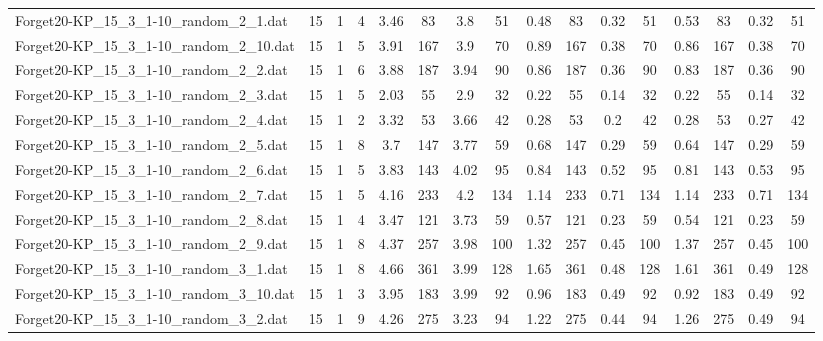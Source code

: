 \begin{sidewaystable}[!ht]
{\begin{tabular}{lccccccccccccccc}
Forget20-KP\_15\_3\_1-10\_random\_2\_1.dat & 15 & 1 & 4 & 3.46 & 83 & 3.8 & 51 & 0.48 & 83 &  \textcolor{blue2}{0.32} & 51 & 0.53 & 83 &  \textcolor{blue2}{0.32} & 51 \\
Forget20-KP\_15\_3\_1-10\_random\_2\_10.dat & 15 & 1 & 5 & 3.91 & 167 & 3.9 & 70 & 0.89 & 167 &  \textcolor{blue2}{0.38} & 70 & 0.86 & 167 &  \textcolor{blue2}{0.38} & 70 \\
Forget20-KP\_15\_3\_1-10\_random\_2\_2.dat & 15 & 1 & 6 & 3.88 & 187 & 3.94 & 90 & 0.86 & 187 &  \textcolor{blue2}{0.36} & 90 & 0.83 & 187 &  \textcolor{blue2}{0.36} & 90 \\
Forget20-KP\_15\_3\_1-10\_random\_2\_3.dat & 15 & 1 & 5 & 2.03 & 55 & 2.9 & 32 & 0.22 & 55 &  \textcolor{blue2}{0.14} & 32 & 0.22 & 55 &  \textcolor{blue2}{0.14} & 32 \\
Forget20-KP\_15\_3\_1-10\_random\_2\_4.dat & 15 & 1 & 2 & 3.32 & 53 & 3.66 & 42 & 0.28 & 53 &  \textcolor{blue2}{0.2} & 42 & 0.28 & 53 & 0.27 & 42 \\
Forget20-KP\_15\_3\_1-10\_random\_2\_5.dat & 15 & 1 & 8 & 3.7 & 147 & 3.77 & 59 & 0.68 & 147 &  \textcolor{blue2}{0.29} & 59 & 0.64 & 147 &  \textcolor{blue2}{0.29} & 59 \\
Forget20-KP\_15\_3\_1-10\_random\_2\_6.dat & 15 & 1 & 5 & 3.83 & 143 & 4.02 & 95 & 0.84 & 143 &  \textcolor{blue2}{0.52} & 95 & 0.81 & 143 & 0.53 & 95 \\
Forget20-KP\_15\_3\_1-10\_random\_2\_7.dat & 15 & 1 & 5 & 4.16 & 233 & 4.2 & 134 & 1.14 & 233 & 0.71 & 134 & 1.14 & 233 & 0.71 & 134 \\
Forget20-KP\_15\_3\_1-10\_random\_2\_8.dat & 15 & 1 & 4 & 3.47 & 121 & 3.73 & 59 & 0.57 & 121 &  \textcolor{blue2}{0.23} & 59 & 0.54 & 121 &  \textcolor{blue2}{0.23} & 59 \\
Forget20-KP\_15\_3\_1-10\_random\_2\_9.dat & 15 & 1 & 8 & 4.37 & 257 & 3.98 & 100 & 1.32 & 257 &  \textcolor{blue2}{0.45} & 100 & 1.37 & 257 &  \textcolor{blue2}{0.45} & 100 \\
Forget20-KP\_15\_3\_1-10\_random\_3\_1.dat & 15 & 1 & 8 & 4.66 & 361 & 3.99 & 128 & 1.65 & 361 &  \textcolor{blue2}{0.48} & 128 & 1.61 & 361 & 0.49 & 128 \\
Forget20-KP\_15\_3\_1-10\_random\_3\_10.dat & 15 & 1 & 3 & 3.95 & 183 & 3.99 & 92 & 0.96 & 183 & 0.49 & 92 & 0.92 & 183 & 0.49 & 92 \\
Forget20-KP\_15\_3\_1-10\_random\_3\_2.dat & 15 & 1 & 9 & 4.26 & 275 & 3.23 & 94 & 1.22 & 275 &  \textcolor{blue2}{0.44} & 94 & 1.26 & 275 & 0.49 & 94 \\

\end{tabular}}
\end{sidewaystable}
